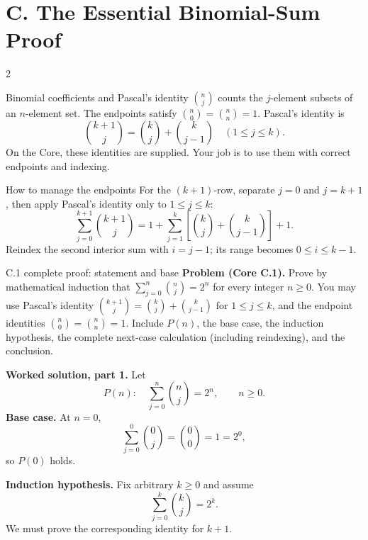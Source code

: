 \documentclass[10pt]{article}
\begin{document}
\section*{C. The Essential Binomial-Sum Proof}
\begin{multicols}{2}
\begin{definitionbox}{Binomial coefficients and Pascal's identity}
$\binom{n}{j}$ counts the $j$-element subsets of an $n$-element set. The
endpoints satisfy $\binom n0=\binom nn=1$. Pascal's identity is
\[
\binom{k+1}{j}=\binom{k}{j}+\binom{k}{j-1}
\quad(1\le j\le k).
\]
On the Core, these identities are supplied. Your job is to use them with
correct endpoints and indexing.
\end{definitionbox}

\begin{methodbox}{How to manage the endpoints}
For the $(k+1)$-row, separate $j=0$ and $j=k+1$, then apply Pascal's identity
only to $1\le j\le k$:
\[
\sum_{j=0}^{k+1}\binom{k+1}{j}
=1+\sum_{j=1}^{k}\left[\binom{k}{j}+\binom{k}{j-1}\right]+1.
\]
Reindex the second interior sum with $i=j-1$; its range becomes
$0\le i\le k-1$.
\end{methodbox}

\begin{workedbox}{C.1 complete proof: statement and base}
\textbf{Problem (Core C.1).} Prove by mathematical induction that
$\sum_{j=0}^{n}\binom nj=2^n$ for every integer $n\ge0$. You may use
Pascal's identity $\binom{k+1}{j}=\binom kj+\binom{k}{j-1}$ for
$1\le j\le k$, and the endpoint identities $\binom n0=\binom nn=1$.
Include $P(n)$, the base case, the induction hypothesis, the complete
next-case calculation (including reindexing), and the conclusion.

\textbf{Worked solution, part 1.}
Let
\[
P(n):\quad \sum_{j=0}^{n}\binom nj=2^n,
\qquad n\ge0.
\]
\textbf{Base case.} At $n=0$,
\[
\sum_{j=0}^{0}\binom0j=\binom00=1=2^0,
\]
so $P(0)$ holds.

\textbf{Induction hypothesis.} Fix arbitrary $k\ge0$ and assume
\[
\sum_{j=0}^{k}\binom kj=2^k.
\]
We must prove the corresponding identity for $k+1$.
\end{workedbox}

\columnbreak


\end{multicols}
\end{document}
